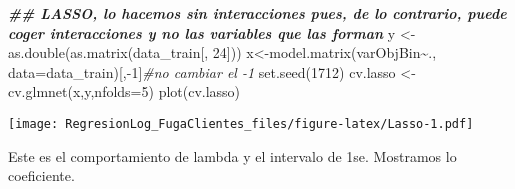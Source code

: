 \documentclass[
]{article}
\newenvironment{Shaded}{\begin{snugshade}}{\end{snugshade}}
\newcommand{\AttributeTok}[1]{\textcolor[rgb]{0.77,0.63,0.00}{#1}}
\newcommand{\CommentTok}[1]{\textcolor[rgb]{0.56,0.35,0.01}{\textit{#1}}}
\newcommand{\DecValTok}[1]{\textcolor[rgb]{0.00,0.00,0.81}{#1}}
\newcommand{\DocumentationTok}[1]{\textcolor[rgb]{0.56,0.35,0.01}{\textbf{\textit{#1}}}}
\newcommand{\FloatTok}[1]{\textcolor[rgb]{0.00,0.00,0.81}{#1}}
\newcommand{\FunctionTok}[1]{\textcolor[rgb]{0.00,0.00,0.00}{#1}}
\newcommand{\NormalTok}[1]{#1}
\newcommand{\OtherTok}[1]{\textcolor[rgb]{0.56,0.35,0.01}{#1}}
\newcommand{\SpecialCharTok}[1]{\textcolor[rgb]{0.00,0.00,0.00}{#1}}
\begin{document}
\begin{Shaded}
\begin{Highlighting}[]
\DocumentationTok{\#\# LASSO, lo hacemos sin interacciones pues, de lo contrario, puede coger interacciones y no las variables que las forman}
\NormalTok{y }\OtherTok{\textless{}{-}} \FunctionTok{as.double}\NormalTok{(}\FunctionTok{as.matrix}\NormalTok{(data\_train[, }\DecValTok{24}\NormalTok{]))}
\NormalTok{x}\OtherTok{\textless{}{-}}\FunctionTok{model.matrix}\NormalTok{(varObjBin}\SpecialCharTok{\textasciitilde{}}\NormalTok{., }\AttributeTok{data=}\NormalTok{data\_train)[,}\SpecialCharTok{{-}}\DecValTok{1}\NormalTok{]}\CommentTok{\#no cambiar el {-}1}
\FunctionTok{set.seed}\NormalTok{(}\DecValTok{1712}\NormalTok{)}
\NormalTok{cv.lasso }\OtherTok{\textless{}{-}} \FunctionTok{cv.glmnet}\NormalTok{(x,y,}\AttributeTok{nfolds=}\DecValTok{5}\NormalTok{)}
\FunctionTok{plot}\NormalTok{(cv.lasso)}
\end{Highlighting}
\end{Shaded}

\texttt{[image: RegresionLog\_FugaClientes\_files/figure-latex/Lasso-1.pdf]}

Este es el comportamiento de lambda y el intervalo de 1se. Mostramos lo
coeficiente.

\begin{Shaded}
\end{Shaded}
\end{document}
